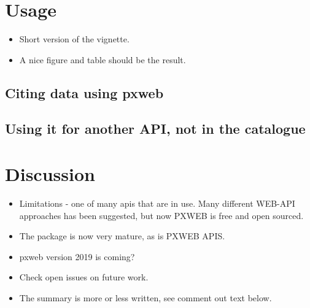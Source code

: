 \documentclass[article]{jss}
\begin{document}


\section[Usage]{Usage}

\begin{itemize}
    \item Short version of the vignette.
    \item A nice figure and table should be the result.
\end{itemize}


\subsection{Citing data using pxweb}

\subsection{Using it for another API, not in the catalogue}


\section[summary]{Discussion}

\begin{itemize}
    \item Limitations - one of many apis that are in use. Many different WEB-API approaches has been suggested, but now PXWEB is free and open sourced.
    \item The package is now very mature, as is PXWEB APIS.
    \item pxweb version 2019 is coming?
    \item Check open issues on future work.
    \item The summary is more or less written, see comment out text below.
\end{itemize}
\end{document}
